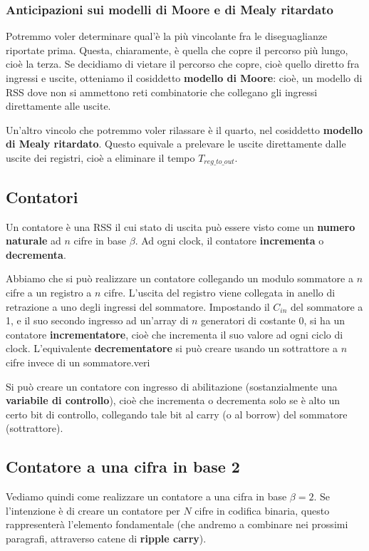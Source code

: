 \documentclass[a4paper,11pt]{article}
\begin{document}
\subsubsection{Anticipazioni sui modelli di Moore e di Mealy ritardato}
Potremmo voler determinare qual'è la più vincolante fra le diseguaglianze riportate prima.
Questa, chiaramente, è quella che copre il percorso più lungo, cioè la terza.
Se decidiamo di vietare il percorso che copre, cioè quello diretto fra ingressi e uscite, otteniamo il cosiddetto \textbf{modello di Moore}: cioè, un modello di RSS dove non si ammettono reti combinatorie che collegano gli ingressi direttamente alle uscite.

Un'altro vincolo che potremmo voler rilassare è il quarto, nel cosiddetto \textbf{modello di Mealy ritardato}.
Questo equivale a prelevare le uscite direttamente dalle uscite dei registri, cioè a eliminare il tempo $T_{reg\_to\_out}$.

\subsection{Contatori}
Un contatore è una RSS il cui stato di uscita può essere visto come un \textbf{numero naturale} ad $n$ cifre in base $\beta$.
Ad ogni clock, il contatore \textbf{incrementa} o \textbf{decrementa}.

Abbiamo che si può realizzare un contatore collegando un modulo sommatore a $n$ cifre a un registro a $n$ cifre.
L'uscita del registro viene collegata in anello di retrazione a uno degli ingressi del sommatore.
Impostando il $C_{in}$ del sommatore a 1, e il suo secondo ingresso ad un'array di $n$ generatori di costante 0, si ha un contatore \textbf{incrementatore}, cioè che incrementa il suo valore ad ogni ciclo di clock.
	L'equivalente \textbf{decrementatore} si può creare usando un sottrattore a $n$ cifre invece di un sommatore.veri

Si può creare un contatore con ingresso di abilitazione (sostanzialmente una \textbf{variabile di controllo}), cioè che incrementa o decrementa solo se è alto un certo bit di controllo, collegando tale bit al carry (o al borrow) del sommatore (sottrattore).

\subsection{Contatore a una cifra in base 2}
Vediamo quindi come realizzare un contatore a una cifra in base $\beta = 2$.
Se l'intenzione è di creare un contatore per $N$ cifre in codifica binaria, questo rappresenterà l'elemento fondamentale (che andremo a combinare nei prossimi paragrafi, attraverso catene di \textbf{ripple carry}).
\end{document}
